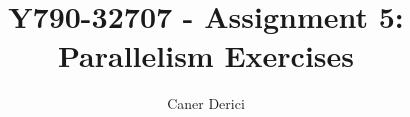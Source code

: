 \documentclass{article}
\title{Y790-32707 - Assignment 5: Parallelism Exercises}
\author{}
\date{Caner Derici}
\begin{document}

\maketitle%

\section{}



\end{document}
